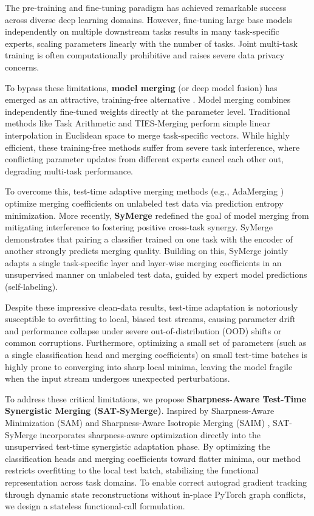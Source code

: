 \documentclass{article}
\begin{document}
The pre-training and fine-tuning paradigm has achieved remarkable success across diverse deep learning domains. However, fine-tuning large base models independently on multiple downstream tasks results in many task-specific experts, scaling parameters linearly with the number of tasks. Joint multi-task training is often computationally prohibitive and raises severe data privacy concerns. 

To bypass these limitations, \textbf{model merging} (or deep model fusion) has emerged as an attractive, training-free alternative \cite{wortsman2022model, ilharco2022editing}. Model merging combines independently fine-tuned weights directly at the parameter level. Traditional methods like Task Arithmetic \cite{ilharco2022editing} and TIES-Merging \cite{yadav2023ties} perform simple linear interpolation in Euclidean space to merge task-specific vectors. While highly efficient, these training-free methods suffer from severe task interference, where conflicting parameter updates from different experts cancel each other out, degrading multi-task performance.

To overcome this, test-time adaptive merging methods (e.g., AdaMerging \cite{yang2024adamerging}) optimize merging coefficients on unlabeled test data via prediction entropy minimization. More recently, \textbf{SyMerge} \cite{jung2025symerge} redefined the goal of model merging from mitigating interference to fostering positive cross-task synergy. SyMerge demonstrates that pairing a classifier trained on one task with the encoder of another strongly predicts merging quality. Building on this, SyMerge jointly adapts a single task-specific layer and layer-wise merging coefficients in an unsupervised manner on unlabeled test data, guided by expert model predictions (self-labeling).

Despite these impressive clean-data results, test-time adaptation is notoriously susceptible to overfitting to local, biased test streams, causing parameter drift and performance collapse under severe out-of-distribution (OOD) shifts or common corruptions. Furthermore, optimizing a small set of parameters (such as a single classification head and merging coefficients) on small test-time batches is highly prone to converging into sharp local minima, leaving the model fragile when the input stream undergoes unexpected perturbations.

To address these critical limitations, we propose \textbf{Sharpness-Aware Test-Time Synergistic Merging (SAT-SyMerge)}. Inspired by Sharpness-Aware Minimization (SAM) \cite{foret2021sharpness} and Sharpness-Aware Isotropic Merging (SAIM) \cite{marczak2025saim}, SAT-SyMerge incorporates sharpness-aware optimization directly into the unsupervised test-time synergistic adaptation phase. By optimizing the classification heads and merging coefficients toward flatter minima, our method restricts overfitting to the local test batch, stabilizing the functional representation across task domains. To enable correct autograd gradient tracking through dynamic state reconstructions without in-place PyTorch graph conflicts, we design a stateless functional-call formulation.
\end{document}
